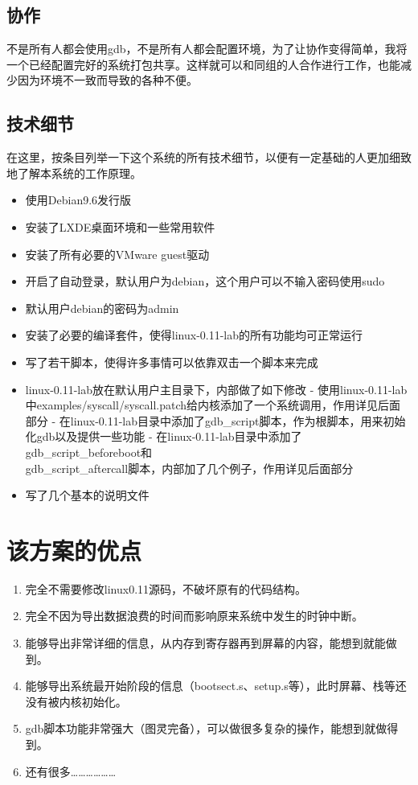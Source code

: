 \documentclass[]{report}
\begin{document}
\subsection{协作}

不是所有人都会使用gdb，不是所有人都会配置环境，为了让协作变得简单，我将一个已经配置完好的系统打包共享。这样就可以和同组的人合作进行工作，也能减少因为环境不一致而导致的各种不便。

\subsection{技术细节}

在这里，按条目列举一下这个系统的所有技术细节，以便有一定基础的人更加细致地了解本系统的工作原理。

\begin{itemize}
    \item 使用Debian9.6发行版
    \item 安装了LXDE桌面环境和一些常用软件
    \item 安装了所有必要的VMware guest驱动
    \item 开启了自动登录，默认用户为debian，这个用户可以不输入密码使用sudo
    \item 默认用户debian的密码为admin
    \item 安装了必要的编译套件，使得linux-0.11-lab的所有功能均可正常运行
    \item 写了若干脚本，使得许多事情可以依靠双击一个脚本来完成
    \item linux-0.11-lab放在默认用户主目录下，内部做了如下修改
    \subitem - 使用linux-0.11-lab中examples/syscall/syscall.patch给内核添加了一个系统调用，作用详见后面部分
    \subitem - 在linux-0.11-lab目录中添加了gdb\_script脚本，作为根脚本，用来初始化gdb以及提供一些功能
    \subitem - 在linux-0.11-lab目录中添加了gdb\_script\_beforeboot和\\gdb\_script\_aftercall脚本，内部加了几个例子，作用详见后面部分
    \item 写了几个基本的说明文件
\end{itemize}

\section{该方案的优点}

\begin{enumerate}
    \item 完全不需要修改linux0.11源码，不破坏原有的代码结构。
    \item 完全不因为导出数据浪费的时间而影响原来系统中发生的时钟中断。
    \item 能够导出非常详细的信息，从内存到寄存器再到屏幕的内容，能想到就能做到。
    \item 能够导出系统最开始阶段的信息（bootsect.s、setup.s等），此时屏幕、栈等还没有被内核初始化。
    \item gdb脚本功能非常强大（图灵完备），可以做很多复杂的操作，能想到就做得到。
    \item 还有很多………………
\end{enumerate}
\end{document}
